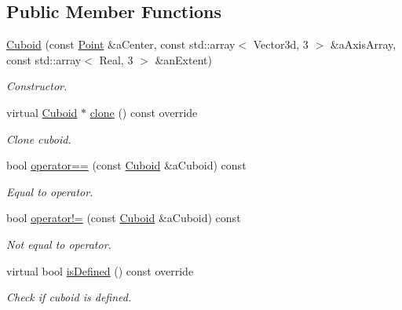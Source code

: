 \subsection*{Public Member Functions}
\begin{DoxyCompactItemize}
\item 
\hyperlink{classostk_1_1math_1_1geom_1_1d3_1_1objects_1_1_cuboid_a1da071d7cbb0a694348628f098f77c5b}{Cuboid} (const \hyperlink{classostk_1_1math_1_1geom_1_1d3_1_1objects_1_1_point}{Point} \&a\+Center, const std\+::array$<$ Vector3d, 3 $>$ \&a\+Axis\+Array, const std\+::array$<$ Real, 3 $>$ \&an\+Extent)
\begin{DoxyCompactList}\small\item\em Constructor. \end{DoxyCompactList}\item 
virtual \hyperlink{classostk_1_1math_1_1geom_1_1d3_1_1objects_1_1_cuboid}{Cuboid} $\ast$ \hyperlink{classostk_1_1math_1_1geom_1_1d3_1_1objects_1_1_cuboid_a0096ba5626ce44a892f05610f6d6eb13}{clone} () const override
\begin{DoxyCompactList}\small\item\em Clone cuboid. \end{DoxyCompactList}\item 
bool \hyperlink{classostk_1_1math_1_1geom_1_1d3_1_1objects_1_1_cuboid_aeb4eab71c3019aef0ad4e561bcf20f06}{operator==} (const \hyperlink{classostk_1_1math_1_1geom_1_1d3_1_1objects_1_1_cuboid}{Cuboid} \&a\+Cuboid) const
\begin{DoxyCompactList}\small\item\em Equal to operator. \end{DoxyCompactList}\item 
bool \hyperlink{classostk_1_1math_1_1geom_1_1d3_1_1objects_1_1_cuboid_a8517c894a67a923ef2179c3f615e5ef1}{operator!=} (const \hyperlink{classostk_1_1math_1_1geom_1_1d3_1_1objects_1_1_cuboid}{Cuboid} \&a\+Cuboid) const
\begin{DoxyCompactList}\small\item\em Not equal to operator. \end{DoxyCompactList}\item 
virtual bool \hyperlink{classostk_1_1math_1_1geom_1_1d3_1_1objects_1_1_cuboid_a4e7dbaf957b92cbbb02dd85c0b505366}{is\+Defined} () const override
\begin{DoxyCompactList}\small\item\em Check if cuboid is defined. \end{DoxyCompactList}\item 

\end{DoxyCompactItemize}
